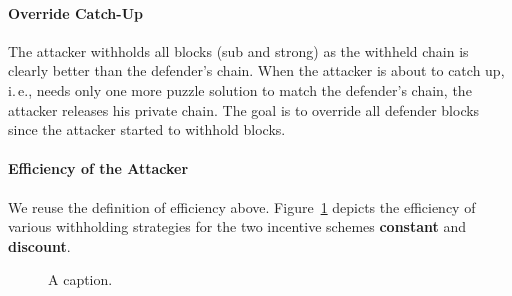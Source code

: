 \documentclass{article}
\begin{document}
\paragraph{Override Catch-Up}
The attacker withholds all blocks (sub and strong) as the withheld chain is clearly better than the defender's chain.
When the attacker is about to catch up, i.\,e., needs only one more puzzle solution to match the defender's chain, the attacker releases his private chain.
The goal is to override all defender blocks since the attacker started to withhold blocks.


\paragraph{Efficiency of the Attacker}

We reuse the definition of efficiency above.
Figure~\ref{fig:attack_efficiency} depicts the efficiency of various withholding strategies for the two incentive schemes \textbf{constant} and \textbf{discount}.

\begin{figure}
  \caption{
    A caption.
  }
  \label{fig:attack_efficiency}
\end{figure}
\end{document}
